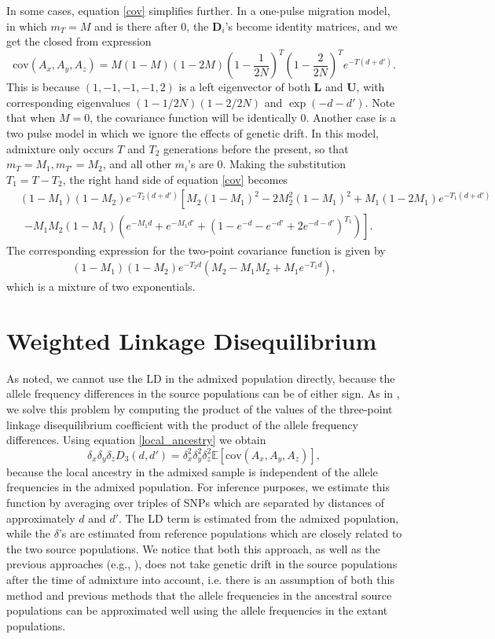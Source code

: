 \documentclass[10pt]{article}
\begin{document}
In some cases, equation \ref{cov} simplifies further. In a one-pulse migration
model, in which $m_T=M$ and is there after 0, the $\mathbf{D}_i$'s become
identity matrices, and we get the closed from expression $$
\text{cov}(A_x,A_y,A_z) =
M(1-M)(1-2M)\left(1-\frac{1}{2N}\right)^T\left(1-\frac{2}{2N}\right)^Te^{-T(d+d')}. $$
This is because $(1,-1,-1,-1,2)$ is a left eigenvector of both $\mathbf{L}$ and
$\mathbf{U}$, with corresponding eigenvalues $(1-1/2N)(1-2/2N)$ and
$\exp(-d-d')$. Note that when $M=0$, the covariance function will be identically
0. Another case is a two pulse model in which we ignore the effects of genetic
drift. In this model, admixture only occurs $T$ and $T_2$ generations before the
present, so that $m_T=M_1,m_{T'}=M_2$, and all other $m_i$'s are 0. Making the
substitution $T_1=T-T_2$, the right hand side of equation \ref{cov} becomes
\begin{align}
&(1-M_1)(1-M_2)e^{-T_2(d+d')}\left[M_2(1-M_1)^2-2M_2^2(1-M_1)^2+M_1(1-2M_1)e^{-T_1(d+d')}\right.\nonumber\\ &\ \
\left.-M_1M_2(1-M_1)\left(e^{-M_1d}+e^{-M_1
d'}+\left(1-e^{-d}-e^{-d'}+2e^{-d-d'}\right)^{T_1}\right) \right]. \label
{ash_2p} \end{align} The corresponding expression for the two-point covariance
function is given by \begin{align}
(1-M_1)(1-M_2)e^{-T_2d}\left(M_2-M_1M_2+M_1e^{-T_1d}\right), \label{alder_2p}
\end{align} which is a mixture of two exponentials.

\section{Weighted Linkage Disequilibrium} As \cite{loh2013inferring} noted, we
cannot use the LD in the admixed population directly, because the allele
frequency differences in the source populations can be of either sign. As in
\cite{loh2013inferring} , we solve this problem by computing the product of the
values of the three-point linkage disequilibrium coefficient with the product of
the allele frequency differences. Using equation \ref{local_ancestry} we obtain $$
\delta_x\delta_y\delta_z
D_3(d,d')=\delta_x^2\delta_y^2\delta_z^2\mathbb{E}[\text{cov}(A_x,A_y,A_z)], $$
because the local ancestry in the admixed sample is independent of the allele
frequencies in the admixed population. For inference purposes, we estimate this
function by averaging over triples of SNPs which are separated by distances of
approximately $d$ and $d'$. The LD term is estimated from the admixed
population, while the $\delta$'s are estimated from reference populations which
are closely related to the two source populations. We notice that both this
approach, as well as the previous approaches (e.g., \cite{loh2013inferring} ),
does not take genetic drift in the source populations after the time of
admixture into account, i.e. there is an assumption of both this method and
previous methods that the allele frequencies in the ancestral source populations
can be approximated well using the allele frequencies in the extant populations.
\end{document}
